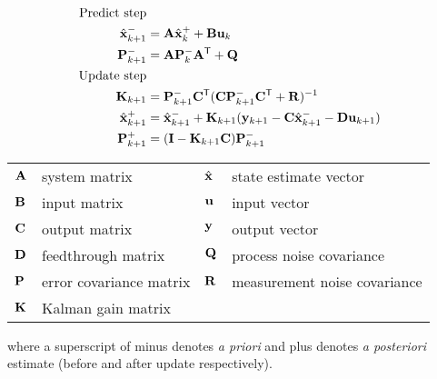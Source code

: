 \begin{theorem}
  \label{thm:kalman_filter}
  \begin{align}
    \text{Predict step} \nonumber \\
    \hat{\mathbf{x}}_{k+1}^- &= \mathbf{A}\hat{\mathbf{x}}_k^+ + \mathbf{B} \mathbf{u}_k \\
    \mathbf{P}_{k+1}^- &= \mathbf{A} \mathbf{P}_k^- \mathbf{A}^\mathsf{T} + \mathbf{Q} \\
    \text{Update step} \nonumber \\
    \mathbf{K}_{k+1} &=
      \mathbf{P}_{k+1}^- \mathbf{C}^\mathsf{T} (\mathbf{C}\mathbf{P}_{k+1}^- \mathbf{C}^\mathsf{T} +
      \mathbf{R})^{-1} \\
    \hat{\mathbf{x}}_{k+1}^+ &=
      \hat{\mathbf{x}}_{k+1}^- + \mathbf{K}_{k+1}(\mathbf{y}_{k+1} -
      \mathbf{C} \hat{\mathbf{x}}_{k+1}^- - \mathbf{D}\mathbf{u}_{k+1}) \\
    \mathbf{P}_{k+1}^+ &= (\mathbf{I} - \mathbf{K}_{k+1}\mathbf{C})\mathbf{P}_{k+1}^-
  \end{align}
  \begin{figurekey}
    \begin{tabular}{llll}
      $\mathbf{A}$ & system matrix & $\hat{\mathbf{x}}$ & state estimate vector \\
      $\mathbf{B}$ & input matrix       & $\mathbf{u}$ & input vector \\
      $\mathbf{C}$ & output matrix      & $\mathbf{y}$ & output vector \\
      $\mathbf{D}$ & feedthrough matrix & $\mathbf{Q}$ & process noise covariance \\
      $\mathbf{P}$ & error covariance matrix & $\mathbf{R}$ & measurement noise covariance \\
      $\mathbf{K}$ & Kalman gain matrix & &
    \end{tabular}
  \end{figurekey}

  where a superscript of minus denotes \textit{a priori} and plus denotes
  \textit{a posteriori} estimate (before and after update respectively).
\end{theorem}

